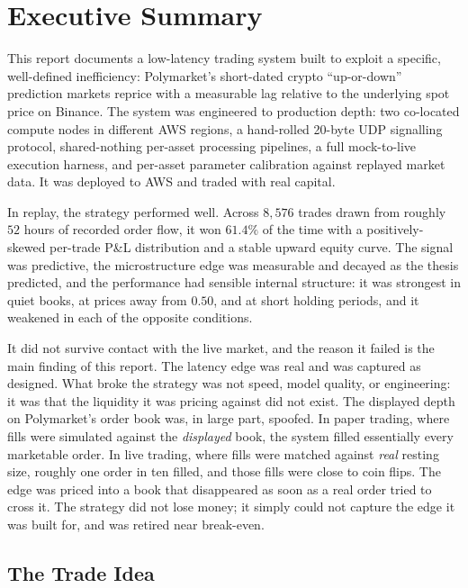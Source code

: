 \documentclass{tmsce}
\let\oldsection\section
\renewcommand{\section}{\clearpage\oldsection}
\begin{document}
\clearpage
\tableofcontents
\clearpage


\section{Executive Summary}

This report documents a low-latency trading system built to exploit a specific,
well-defined inefficiency: Polymarket's short-dated crypto ``up-or-down''
prediction markets reprice with a measurable lag relative to the underlying spot
price on Binance. The system was engineered to production depth: two co-located
compute nodes in different AWS regions, a hand-rolled 20-byte UDP signalling
protocol, shared-nothing per-asset processing pipelines, a full mock-to-live execution
harness, and per-asset parameter calibration against replayed market data. It was
deployed to AWS and traded with real capital.

\medskip
\noindent In replay, the strategy performed well. Across $8{,}576$ trades drawn from
roughly $52$ hours of recorded order flow, it won $61.4\%$ of the time with a
positively-skewed per-trade P\&L distribution and a stable upward equity curve. The
signal was predictive, the microstructure edge was measurable and decayed as the
thesis predicted, and the performance had sensible internal structure: it was
strongest in quiet books, at prices away from $0.50$, and at short holding periods,
and it weakened in each of the opposite conditions.

\medskip
\noindent It did not survive contact with the live market, and the reason it failed
is the main finding of this report. The latency edge was real and was captured as
designed. What broke the strategy was not speed, model quality, or engineering: it
was that the liquidity it was pricing against did not exist. The displayed depth on
Polymarket's order book was, in large part, spoofed. In paper trading, where fills
were simulated against the \emph{displayed} book, the system filled essentially every
marketable order. In live trading, where fills were matched against \emph{real}
resting size, roughly one order in ten filled, and those fills were close to coin
flips. The edge was priced into a book that disappeared as soon as a real order tried
to cross it. The strategy did not lose money; it simply could not capture the edge it
was built for, and was retired near break-even.

\subsection{The Trade Idea}
\end{document}
